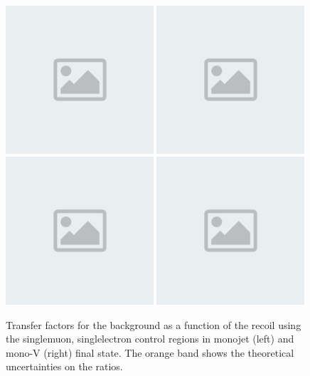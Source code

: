 \begin{figure}[htbp]
  \includegraphics[width=0.49\textwidth]{placeholder.png}
  \includegraphics[width=0.49\textwidth]{placeholder.png}
  \\
  \includegraphics[width=0.49\textwidth]{placeholder.png}
  \includegraphics[width=0.49\textwidth]{placeholder.png}
  \caption{Transfer factors for the \Wlvjets background as a function of the recoil using the singlemuon, singlelectron control regions in monojet (left) and mono-V (right) final state. The orange band shows the theoretical uncertainties on the ratios.}  \label{fig:WJets_SF}
\end{figure}

